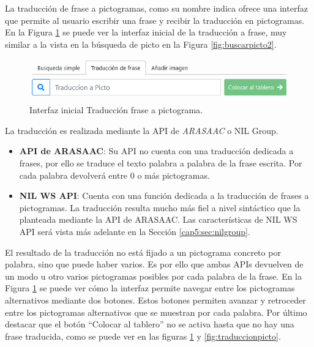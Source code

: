 La traducción de frase a pictogramas, como su nombre indica ofrece una interfaz que permite al usuario escribir una frase y recibir la traducción en pictogramas. En la Figura \ref{fig:traducirfraseinicial} se puede ver la interfaz inicial de la traducción a frase, muy similar a la vista en la búsqueda de picto en la Figura \ref{fig:buscarpicto2}. 

\begin{figure}[h!]
	\centering
	\includegraphics[width=0.7\linewidth]{Imagenes/Bitmap/traducirFraseInicial}
	\caption{Interfaz inicial Traducción frase a pictograma.}
	\label{fig:traducirfraseinicial}
\end{figure}


La traducción es realizada mediante la API de \textit{ARASAAC} o NIL Group.


\begin{itemize}
	\item \textbf{API de ARASAAC}: Su API no cuenta con una traducción dedicada a frases, por ello se traduce el texto palabra a palabra de la frase escrita. Por cada palabra devolverá entre 0 o más pictogramas.
	\item \textbf{NIL WS API}:  Cuenta con una función dedicada a la traducción de frases a pictogramas. La traducción resulta mucho más fiel a nivel sintáctico que la planteada  mediante la API de ARASAAC. Las características de NIL WS API será vista más adelante en la Sección \ref{cap5:sec:nilgroup}.
\end{itemize}

El resultado de la traducción no está fijado a un pictograma concreto por palabra, sino que puede haber varios. Es por ello que ambas APIs devuelven de un modo u otro varios pictogramas posibles por cada palabra de la frase.  En la Figura \ref{fig:traducirfraseinicial} se puede ver cómo la interfaz permite navegar entre los pictogramas alternativos mediante dos botones.
Estos botones permiten avanzar y retroceder entre los pictogramas alternativos que se muestran por cada palabra. Por último destacar que el botón “Colocar al tablero” no se activa hasta que no hay una frase traducida, como se puede ver en las figuras \ref{fig:traducirfraseinicial} y \ref{fig:traduccionpicto}. 

